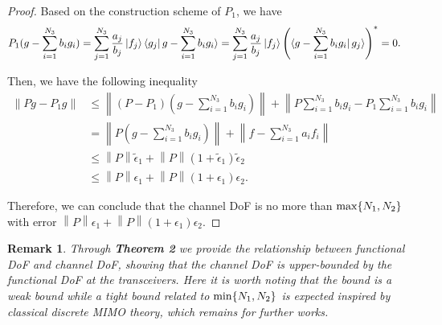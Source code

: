 \documentclass[12pt,draftclsnofoot,journal,onecolumn]{IEEEtran}
\newtheorem{remark}{Remark}
\begin{document}
\begin{proof}
		Based on the construction scheme of $P_1$, we have 
		\begin{equation}
			\begin{aligned}
				P_1 (g-\sum_{i=1}^{N_3}b_ig_i ) &= \sum_{j=1}^{N_3}\frac{a_j}{b_j} \ket{f_j} \bra{g_j} g-\sum_{i=1}^{N_3}b_ig_i \rangle
				 = \sum_{j=1}^{N_3}\frac{a_j}{b_j} \ket{f_j} \left(\bra{g-\sum_{i=1}^{N_3}b_ig_i} g_j \rangle \right)^* = 0.
			\end{aligned}
		\end{equation}
		
		Then, we have the following inequality
		\begin{equation}
			\begin{aligned}
				\left\|  Pg - P_1 g  \right\| &\leqslant \left\| (P-P_1)(g-\sum_{i=1}^{N_3}b_ig_i)  \right\|  + \left\| P\sum_{i=1}^{N_3}b_ig_i -P_1\sum_{i=1}^{N_3}b_ig_i  \right\|
				\\&= \left\| P(g-\sum_{i=1}^{N_3}b_ig_i)  \right\|  + \left\| f - \sum_{i=1}^{N_3} a_i f_i \right\|
				\\& \leqslant \left\| P \right\| \tilde{\epsilon}_1 + \left\|  P \right\| (1+\tilde{\epsilon}_1) \tilde{\epsilon}_2
				\\&\leqslant \left\| P \right\| \epsilon_1 + \left\|  P \right\| (1+\epsilon_1) \epsilon_2.
			\end{aligned}
		\end{equation}
		
			Therefore, we can conclude that the channel DoF is no more than ${\rm max}\{N_1,N_2\}$ with error $\left\| P \right\| \epsilon_1 + \left\|  P \right\| (1+\epsilon_1) \epsilon_2$.
	\end{proof}
	
	\begin{remark}
		Through {\bf Theorem 2} we provide the relationship between functional DoF and channel DoF, showing that the channel DoF is upper-bounded by the functional DoF at the transceivers. Here it is worth noting that the bound is a weak bound while a tight bound related to ${\rm min}\{N_1,N_2\}$ is expected inspired by classical discrete MIMO theory, which remains for further works.
	\end{remark}
\end{document}
